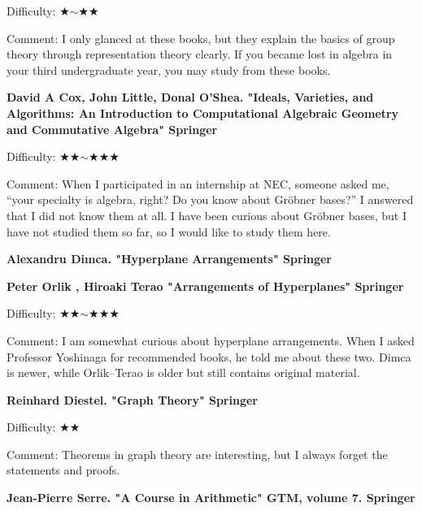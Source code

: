 Difficulty: ★$\sim$★★ 　 　\vspace{-6pt} 

Comment: I only glanced at these books, but they explain the basics of group theory through representation theory clearly. If you became lost in algebra in your third undergraduate year, you may study from these books. 

\vspace{8pt}


\textbf{David A Cox, John Little, Donal O'Shea. "Ideals, Varieties, and Algorithms: An Introduction to Computational Algebraic Geometry and Commutative Algebra" Springer}  　\vspace{-6pt} 

Difficulty: ★★$\sim$★★★\vspace{-6pt} 

Comment: When I participated in an internship at NEC, someone asked me, ``your specialty is algebra, right? Do you know about Gr\"obner bases?'' I answered that I did not know them at all. I have been curious about Gr\"obner bases, but I have not studied them so far, so I would like to study them here.
\vspace{8pt}

\textbf{Alexandru Dimca. "Hyperplane Arrangements" Springer}  　\vspace{-6pt} 

\textbf{Peter Orlik , Hiroaki Terao "Arrangements of Hyperplanes" Springer}  　\vspace{-6pt} 

Difficulty: ★★$\sim$★★★\vspace{-6pt} 

Comment: I am somewhat curious about hyperplane arrangements. When I asked Professor Yoshinaga for recommended books, he told me about these two. Dimca is newer, while Orlik--Terao is older but still contains original material.
\vspace{8pt}

\textbf{Reinhard Diestel. "Graph Theory" Springer}  　\vspace{-6pt} 

Difficulty: ★★\vspace{-6pt} 

Comment: Theorems in graph theory are interesting, but I always forget the statements and proofs.
\vspace{8pt}


\textbf{Jean-Pierre Serre. "A Course in Arithmetic" GTM, volume 7. Springer}  　\vspace{-6pt} 

